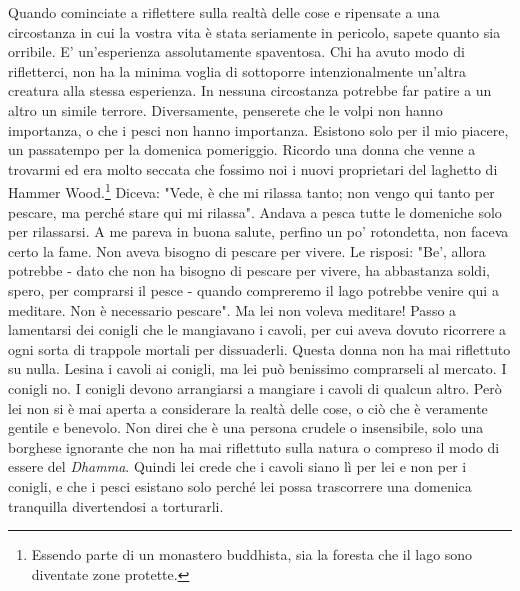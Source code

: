 Quando cominciate a riflettere sulla realtà delle cose e ripensate a una
circostanza in cui la vostra vita è stata seriamente in pericolo, sapete
quanto sia orribile. E' un'esperienza assolutamente spaventosa. Chi ha
avuto modo di rifletterci, non ha la minima voglia di sottoporre
intenzionalmente un'altra creatura alla stessa esperienza. In nessuna
circostanza potrebbe far patire a un altro un simile terrore.
Diversamente, penserete che le volpi non hanno importanza, o che i pesci
non hanno importanza. Esistono solo per il mio piacere, un passatempo
per la domenica pomeriggio. Ricordo una donna che venne a trovarmi ed
era molto seccata che fossimo noi i nuovi proprietari del laghetto di
Hammer Wood.\footnote{Essendo parte di un monastero buddhista, sia la foresta
che il lago sono diventate zone protette.} Diceva: "Vede, è che mi rilassa tanto; non
vengo qui tanto per pescare, ma perché stare qui mi rilassa". Andava a
pesca tutte le domeniche solo per rilassarsi. A me pareva in buona
salute, perfino un po' rotondetta, non faceva certo la fame. Non aveva
bisogno di pescare per vivere. Le risposi: "Be', allora potrebbe - dato
che non ha bisogno di pescare per vivere, ha abbastanza soldi, spero,
per comprarsi il pesce - quando compreremo il lago potrebbe venire qui a
meditare. Non è necessario pescare". Ma lei non voleva meditare! Passo a
lamentarsi dei conigli che le mangiavano i cavoli, per cui aveva dovuto
ricorrere a ogni sorta di trappole mortali per dissuaderli. Questa donna
non ha mai riflettuto su nulla. Lesina i cavoli ai conigli, ma lei può
benissimo comprarseli al mercato. I conigli no. I conigli devono
arrangiarsi a mangiare i cavoli di qualcun altro. Però lei non si è mai
aperta a considerare la realtà delle cose, o ciò che è veramente gentile
e benevolo. Non direi che è una persona crudele o insensibile, solo una
borghese ignorante che non ha mai riflettuto sulla natura o compreso il
modo di essere del \textit{Dhamma}. Quindi lei crede che i cavoli siano lì per
lei e non per i conigli, e che i pesci esistano solo perché lei possa
trascorrere una domenica tranquilla divertendosi a torturarli.

